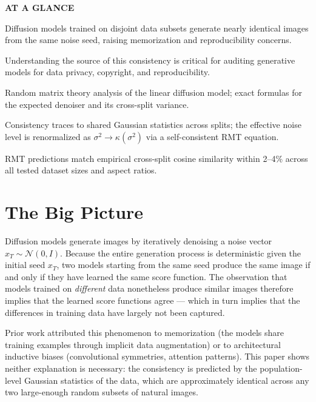 \documentclass[10pt,twocolumn]{article}
\begin{document}
\begin{mdframed}[backgroundcolor=boxgray,linecolor=rulered,linewidth=1pt,
    innerleftmargin=6pt,innerrightmargin=6pt,
    innertopmargin=6pt,innerbottommargin=6pt]
\textbf{\small AT A GLANCE}\par\vspace{4pt}
\begin{description}[leftmargin=0pt,labelsep=4pt,itemsep=2pt,parsep=0pt,
    font=\small\bfseries]
  \item[Problem:] Diffusion models trained on disjoint data subsets
    generate nearly identical images from the same noise seed, raising
    memorization and reproducibility concerns.
  \item[Why it matters:] Understanding the source of this consistency
    is critical for auditing generative models for data privacy, copyright,
    and reproducibility.
  \item[Method:] Random matrix theory analysis of the linear diffusion model;
    exact formulas for the expected denoiser and its cross-split variance.
  \item[Result:] Consistency traces to shared Gaussian statistics across
    splits; the effective noise level is renormalized as $\sigma^2 \to \kappa(\sigma^2)$
    via a self-consistent RMT equation.
  \item[Evidence:] RMT predictions match empirical cross-split cosine
    similarity within 2--4\% across all tested dataset sizes and aspect ratios.
\end{description}
\end{mdframed}

\section{The Big Picture}

Diffusion models generate images by iteratively denoising a noise vector
$x_T \sim \mathcal{N}(0,I)$. Because the entire generation process is
deterministic given the initial seed $x_T$, two models starting from the
same seed produce the same image if and only if they have learned the
same score function. The observation that models trained on \emph{different}
data nonetheless produce similar images therefore implies that the learned
score functions agree --- which in turn implies that the differences in
training data have largely not been captured.

Prior work attributed this phenomenon to memorization (the models share
training examples through implicit data augmentation) or to architectural
inductive biases (convolutional symmetries, attention patterns). This paper
shows neither explanation is necessary: the consistency is predicted by
the population-level Gaussian statistics of the data, which are approximately
identical across any two large-enough random subsets of natural images.
\end{document}
